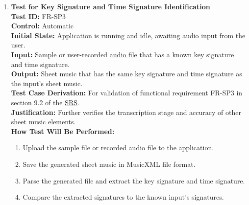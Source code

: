 \documentclass[12pt, titlepage]{article}
\begin{document}
\begin{enumerate}
    \item \textbf{Test for Key Signature and Time Signature Identification} \\
      \newline
      \textbf{Test ID:} FR-SP3 \\
      \textbf{Control:} Automatic \\
      \textbf{Initial State:} Application is running and idle, awaiting audio input from the user. \\
      \textbf{Input:} Sample or user-recorded \href{https://github.com/emilyperica/ScoreGen/blob/main/test/TestingDatasets/piano-samples/sample-scales/c-major-scale-on-treble-clef.wav}{audio file} that has a known key signature and time signature. \\
      \textbf{Output:} Sheet music that has the same key signature and time signature as the input’s sheet music. \\
      \textbf{Test Case Derivation:} For validation of functional requirement FR-SP3 in section 9.2 of the 
      \href{https://github.com/emilyperica/ScoreGen/blob/main/docs/SRS-Volere/SRS.pdf}{SRS}. \\
      \textbf{Justification:} Further verifies the transcription stage and accuracy of other sheet music elements.\\
      \textbf{How Test Will Be Performed:}
      \begin{enumerate}
          \item Upload the sample file or recorded audio file to the application.
          \item Save the generated sheet music in MusicXML file format.
          \item Parse the generated file and extract the key signature and time signature.
          \item Compare the extracted signatures to the known input’s signatures.
      \end{enumerate}


\end{enumerate}
\end{document}
